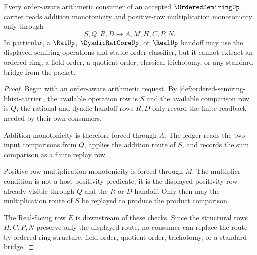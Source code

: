 \begin{theorem}
\label{thm:ordered-semiring-add-mul-order-compatibility}
Every order-aware arithmetic consumer of an accepted $\OrderedSemiringUp$ carrier reads addition monotonicity and positive-row multiplication monotonicity only through
$$
S,Q,R,D \longmapsto A,M,H,C,P,N .
$$
In particular, a $\RatUp$, $\DyadicRatCoreUp$, or $\RealUp$ handoff may use the displayed semiring operations and stable order classifier, but it cannot extract an ordered ring, a field order, a quotient order, classical trichotomy, or any standard bridge from the packet.
\end{theorem}
\begin{proof}
Begin with an order-aware arithmetic request. By \autoref{def:ordered-semiring-bhist-carrier}, the available operation row is $S$ and the available comparison row is $Q$; the rational and dyadic handoff rows $R,D$ only record the finite readback needed by their own consumers.

Addition monotonicity is therefore forced through $A$. The ledger reads the two input comparisons from $Q$, applies the addition route of $S$, and records the sum comparison as a finite replay row.

Positive-row multiplication monotonicity is forced through $M$. The multiplier condition is not a host positivity predicate; it is the displayed positivity row already visible through $Q$ and the $R$ or $D$ handoff. Only then may the multiplication route of $S$ be replayed to produce the product comparison.

The Real-facing row $E$ is downstream of these checks. Since the structural rows $H,C,P,N$ preserve only the displayed route, no consumer can replace the route by ordered-ring structure, field order, quotient order, trichotomy, or a standard bridge.
\end{proof}

